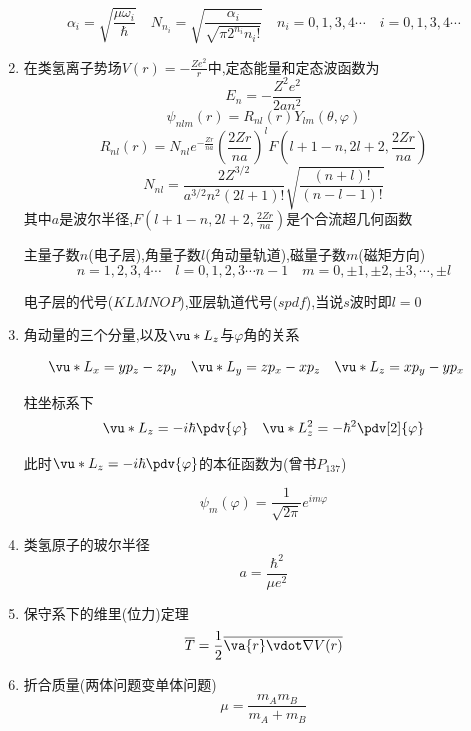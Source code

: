 \begin{formal}
\begin{enumerate}
                    $$ \alpha_{i} = \sqrt{\frac{\mu \omega_{i}}{\hbar}} \quad N_{n_{i}} = \sqrt{\frac{\alpha_{i}}{\sqrt{\pi 2^{n_{i}}n_{i}!}}}  \quad n_{i} = 0,1,3,4\cdots \quad i=0,1,3,4\cdots $$

                    \item 在类氢离子势场$V(r) = -\frac{Ze^{2}}{r}$中,定态能量和定态波函数为
                    $$ E_{n} = - \frac{Z^{2} e^{2}}{2a n^{2}} $$
                    $$ \psi_{nlm}(r) = R_{nl}(r) Y_{lm}(\theta,\varphi) $$
                    $$ R_{nl}(r) = N_{nl} e^{-\frac{Zr}{na}} (\frac{2Zr}{na})^{l} F(l+1-n,2l+2,\frac{2Zr}{na}) $$
                    $$ N_{nl} = \frac{2Z^{3/2}}{a^{3/2}n^{2}(2l+1)!} \sqrt{\frac{(n+l)!}{(n-l-1)!}}  $$
                    其中$a$是波尔半径,$F(l+1-n,2l+2,\frac{2Zr}{na})$是个合流超几何函数

                    主量子数$n$(电子层),角量子数$l$(角动量轨道),磁量子数$m$(磁矩方向)
                    $$ n = 1,2,3,4\cdots \quad l = 0,1,2,3\cdots n-1 \quad m = 0,\pm1,\pm2,\pm3,\cdots,\pm l $$

                    电子层的代号($KLMNOP$),亚层轨道代号($spdf$),当说$s$波时即$l=0$

                    \item 角动量的三个分量,以及$\vu*{L}_{z}$与$\varphi$角的关系

                    $$ \vu*{L}_{x} = y p_{z} - z p_{y} \quad \vu*{L}_{y} = z p_{x} - x p_{z} \quad \vu*{L}_{z} = x p_{y} - y p_{x} \quad $$
    
                    柱坐标系下
                    $$ \vu*{L}_{z} = -i\hbar \pdv{\varphi} \quad \vu*{L}_{z}^{2} = -\hbar^{2} \pdv[2]{\varphi} $$
    
                    此时$\vu*{L}_{z} = -i\hbar \pdv{\varphi}$的本征函数为(曾书$P_{137}$)
    
                    $$ \psi_{m}(\varphi) = \frac{1}{\sqrt{2\pi}} e^{im\varphi} $$

                    \item 类氢原子的玻尔半径
                    $$ a = \dfrac{\hbar^{2}}{\mu e^{2}} $$

                    \item 保守系下的维里(位力)定理
                    $$ \overline{T} = \frac{1}{2} \overline{\va{r} \vdot \nabla V(r)} $$

                    \item 折合质量(两体问题变单体问题)
                    $$ \mu = \dfrac{m_{A}m_{B}}{m_{A}+m_{B}} $$


                \end{enumerate}
            \end{formal}

